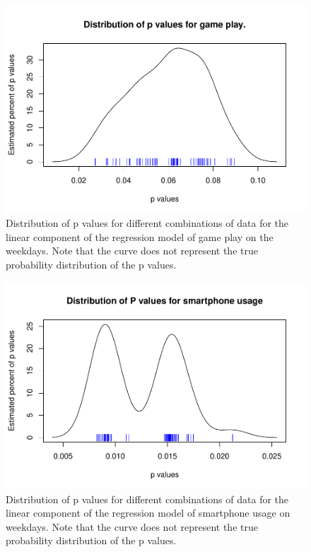 \documentclass[man]{apa6}
\theoremstyle{definition}
\theoremstyle{definition}
\theoremstyle{definition}
\theoremstyle{remark}
\begin{document}
\begin{figure}

{\centering \includegraphics{stats_6_final_files/figure-latex/plotpfirst-1} 

}

\caption{Distribution of p values for different combinations of data for the linear component of the regression model of game play on the weekdays. Note that the curve does not represent the true probability distribution of the p values.}\label{fig:plotpfirst}
\end{figure}
\begin{figure}

{\centering \includegraphics{stats_6_final_files/figure-latex/plotpsecond-1} 

}

\caption{Distribution of p values for different combinations of data for the linear component of the regression model of smartphone usage on weekdays. Note that the curve does not represent the true probability distribution of the p values.}\label{fig:plotpsecond}
\end{figure}
\end{document}
